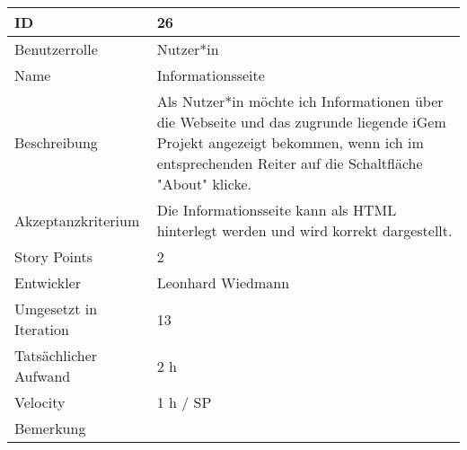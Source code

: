 \begin{tabularx}{\textwidth}{|p{}|X|}
	\hline
	ID & 26\\
	\hline
	Benutzerrolle & Nutzer*in\\
	\hline
	Name & Informationsseite\\
	\hline
	Beschreibung & Als Nutzer*in möchte ich Informationen über die Webseite und das zugrunde liegende iGem Projekt angezeigt bekommen, wenn ich im entsprechenden Reiter auf die Schaltfläche "About" klicke.\\
	\hline
	Akzeptanzkriterium & Die Informationsseite kann als HTML hinterlegt werden und wird korrekt dargestellt.\\
	\hline
	Story Points & 2\\
	\hline
	Entwickler & Leonhard Wiedmann\\
	\hline
	Umgesetzt in Iteration & 13\\
	\hline
	Tatsächlicher Aufwand & 2 h\\
	\hline
	Velocity & 1 h / SP\\
	\hline
	Bemerkung & \\
	\hline
\end{tabularx}
\vspace{20pt}
